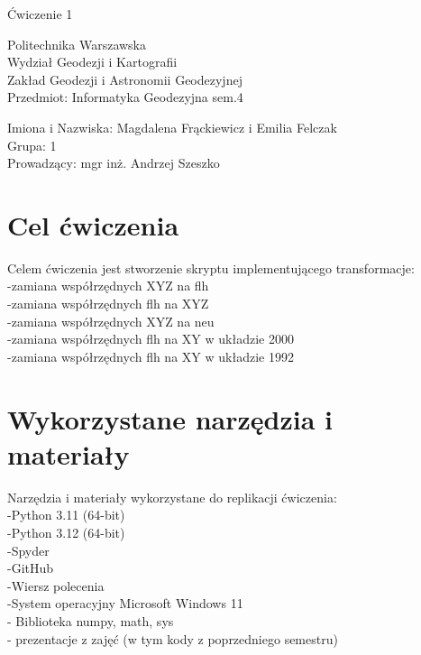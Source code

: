 \documentclass[11pt,a4paper]{article}
\begin{document}
\begin{center}
\Huge 
Ćwiczenie 1\\
\end{center}
\begin{center}
	Politechnika Warszawska\\
	Wydział Geodezji i Kartografii\\
	Zakład Geodezji i Astronomii Geodezyjnej\\
	Przedmiot: Informatyka Geodezyjna sem.4\\
\end{center}
Imiona i Nazwiska: Magdalena Frąckiewicz i Emilia Felczak\\
Grupa: 1\\
Prowadzący: mgr inż. Andrzej Szeszko\\
\tableofcontents 
\newpage
\section {Cel ćwiczenia}
Celem ćwiczenia jest stworzenie skryptu implementującego transformacje:\\
-zamiana współrzędnych XYZ na flh\\
-zamiana współrzędnych flh na XYZ\\
-zamiana współrzędnych XYZ na neu\\
-zamiana współrzędnych flh na XY w układzie 2000\\
-zamiana współrzędnych flh na XY w układzie 1992\\

\section {Wykorzystane narzędzia i materiały}
Narzędzia i materiały wykorzystane do replikacji ćwiczenia:\\
-Python 3.11  (64-bit)\\                                                       
-Python 3.12 (64-bit)  \\                                                                 
-Spyder  \\                                                                              
-GitHub  \\                                                                             
-Wiersz polecenia\\
-System operacyjny  Microsoft Windows 11\\
- Biblioteka numpy, math, sys\\
- prezentacje z zajęć (w tym kody z poprzedniego semestru)\\
\end{document}
